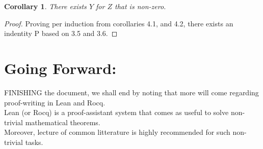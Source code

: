 \documentclass[10pt]{article}
\theoremstyle{plain}
\newtheorem{corollary}[theorem]{Corollary}
\theoremstyle{definition}
\theoremstyle{remark}
\begin{document}
\begin{corollary}
	There exists $Y$ for $Z$ that is non-zero.
\end{corollary}

\begin{proof}
	Proving per induction from corollaries 4.1, and 4.2, there exists an indentity P based on 3.5 and 3.6.
\end{proof}

\section{Going Forward:}

\lettrine[lines=2, lhang=0.1, loversize=0.2]{F}INISHING the document, we shall end by noting that more will come regarding proof-writing in Lean and Rocq.\\Lean (or Rocq) is a proof-assistant system that comes as useful to solve non-trivial mathematical theorems.\\Moreover, lecture of common litterature is highly recommended for such non-trivial tasks.

\nocite{*}





\end{document}

